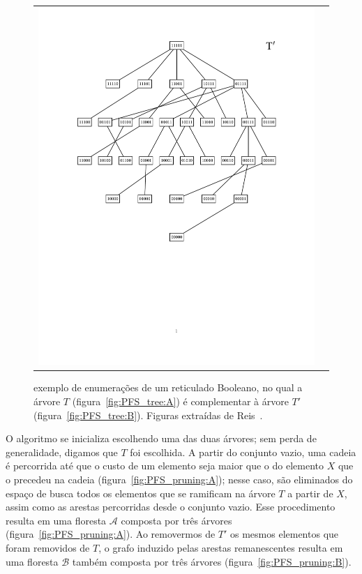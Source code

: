 \documentclass[12pt]{article}
\begin{document}
\begin{figure}[h]
\begin{tabular}{c c}
{{    \includegraphics[trim=3cm 8.5cm 1.2cm 2cm, clip=true]{PFS_tree_B.pdf}}
    \label{fig:PFS_tree:B} }
  \end{tabular}
  \caption{exemplo de enumerações de um reticulado Booleano, no qual a
árvore $T$ (figura~\ref{fig:PFS_tree:A}) é complementar à árvore $T'$
(figura~\ref{fig:PFS_tree:B}). Figuras extraídas de Reis~\cite{msreis thesis}.}
  \label{fig:PFS_tree} 
\end{figure}

O algoritmo se inicializa escolhendo uma das duas árvores; sem perda de generalidade, digamos que $T$ foi escolhida. A partir
do conjunto vazio, uma cadeia é percorrida até que o custo de um elemento seja maior que o do elemento $X$ que o precedeu na cadeia (figura~\ref{fig:PFS_pruning:A}); nesse caso, são eliminados do espaço de busca todos os elementos que se ramificam na árvore $T$ a partir de $X$, assim como as arestas percorridas desde o conjunto vazio. Esse procedimento resulta em uma floresta $\mathcal{A}$ composta por três árvores (figura~\ref{fig:PFS_pruning:A}). Ao removermos de $T'$ os mesmos elementos que foram removidos de $T$, o grafo induzido pelas arestas remanescentes resulta em uma floresta $\mathcal{B}$ também composta por três árvores (figura~\ref{fig:PFS_pruning:B}).
\end{document}
